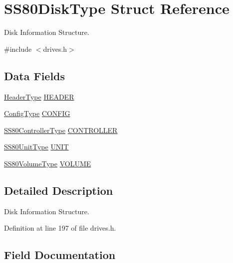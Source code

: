 \hypertarget{structSS80DiskType}{}\section{S\+S80\+Disk\+Type Struct Reference}
\label{structSS80DiskType}


Disk Information Structure.  




{\ttfamily \#include $<$drives.\+h$>$}

\subsection*{Data Fields}
\begin{DoxyCompactItemize}
\item 
\hyperlink{structHeaderType}{Header\+Type} \hyperlink{structSS80DiskType_ae66c0130dee8c362743dfdfc41539c3b}{H\+E\+A\+D\+ER}
\item 
\hyperlink{structConfigType}{Config\+Type} \hyperlink{structSS80DiskType_aeff2b9e1dcd95310e9e8dee63a60ed95}{C\+O\+N\+F\+IG}
\item 
\hyperlink{structSS80ControllerType}{S\+S80\+Controller\+Type} \hyperlink{structSS80DiskType_ae9da84cba5786cf755c388eba065c0cd}{C\+O\+N\+T\+R\+O\+L\+L\+ER}
\item 
\hyperlink{structSS80UnitType}{S\+S80\+Unit\+Type} \hyperlink{structSS80DiskType_ac630da1440afd60d726c7c41eb7b990c}{U\+N\+IT}
\item 
\hyperlink{structSS80VolumeType}{S\+S80\+Volume\+Type} \hyperlink{structSS80DiskType_adef69576dbc48a5d70ff628578d77b60}{V\+O\+L\+U\+ME}
\end{DoxyCompactItemize}


\subsection{Detailed Description}
Disk Information Structure. 

Definition at line 197 of file drives.\+h.



\subsection{Field Documentation}
\mbox{\label{structSS80DiskType_aeff2b9e1dcd95310e9e8dee63a60ed95}} 
